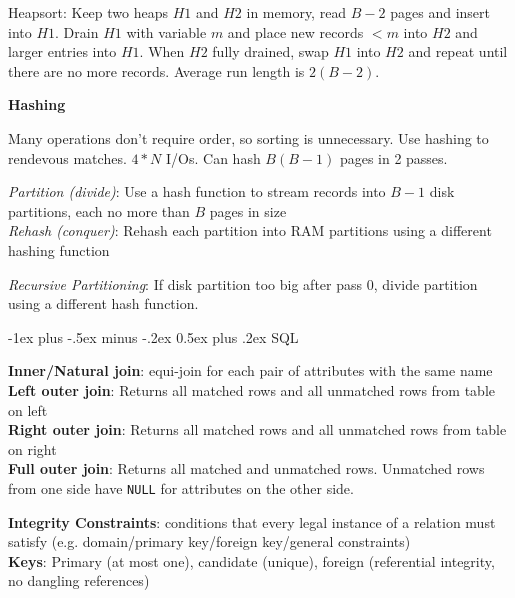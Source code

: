 \documentclass[10pt,landscape]{article}
\makeatletter
\renewcommand{\section}{\@startsection{section}{1}{0mm}%
                                {-1ex plus -.5ex minus -.2ex}%
                                {0.5ex plus .2ex}%
                                {\normalfont\large\bfseries}}
\makeatother
\begin{document}
\begin{multicols}{3}
Heapsort: Keep two heaps $H1$ and $H2$ in memory, read $B-2$ pages and insert into $H1$. Drain $H1$ with variable $m$ and place new records $<m$ into $H2$ and larger entries into $H1$. When $H2$ fully drained, swap $H1$ into $H2$ and repeat until there are no more records. Average run length is $2(B-2)$.

\textbf{Hashing}

Many operations don't require order, so sorting is unnecessary. Use hashing to rendevous matches. $4*N$ I/Os. Can hash $B(B-1)$ pages in 2 passes.

\textit{Partition (divide)}: Use a hash function to stream records into $B-1$ disk partitions, each no more than $B$ pages in size \\
\textit{Rehash (conquer)}: Rehash each partition into RAM partitions using a different hashing function

\textit{Recursive Partitioning}: If disk partition too big after pass 0, divide partition using a different hash function.


\section{SQL}

%
%

\textbf{Inner/Natural join}: equi-join for each pair of attributes with the same name \\
\textbf{Left outer join}: Returns all matched rows and all unmatched rows from table on left \\
\textbf{Right outer join}: Returns all matched rows and all unmatched rows from table on right \\
\textbf{Full outer join}: Returns all matched and unmatched rows. Unmatched rows from one side have \texttt{NULL} for attributes on the other side.

\textbf{Integrity Constraints}: conditions that every legal instance of a relation must satisfy (e.g. domain/primary key/foreign key/general constraints) \\
\textbf{Keys}: Primary (at most one), candidate (unique), foreign (referential integrity, no dangling references)


\end{multicols}
\end{document}
